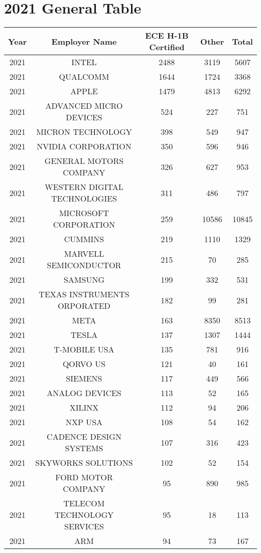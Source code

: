 \documentclass{article}%
\begin{document}
\section{2021 General Table}%
\label{sec:2021GeneralTable}%
\begin{longtable}{c|c|c|c|c}%
\hline%
Year&Employer Name&ECE \newline%
 H{-}1B \newline%
 Certified&Other&Total\\%
\hline%
2021&INTEL&2488&3119&5607\\%
\hline%
2021&QUALCOMM&1644&1724&3368\\%
\hline%
2021&APPLE&1479&4813&6292\\%
\hline%
2021&ADVANCED MICRO DEVICES&524&227&751\\%
\hline%
2021&MICRON TECHNOLOGY&398&549&947\\%
\hline%
2021&NVIDIA CORPORATION&350&596&946\\%
\hline%
2021&GENERAL MOTORS COMPANY&326&627&953\\%
\hline%
2021&WESTERN DIGITAL TECHNOLOGIES&311&486&797\\%
\hline%
2021&MICROSOFT CORPORATION&259&10586&10845\\%
\hline%
2021&CUMMINS&219&1110&1329\\%
\hline%
2021&MARVELL SEMICONDUCTOR&215&70&285\\%
\hline%
2021&SAMSUNG&199&332&531\\%
\hline%
2021&TEXAS INSTRUMENTS ORPORATED&182&99&281\\%
\hline%
2021&META&163&8350&8513\\%
\hline%
2021&TESLA&137&1307&1444\\%
\hline%
2021&T{-}MOBILE USA&135&781&916\\%
\hline%
2021&QORVO US&121&40&161\\%
\hline%
2021&SIEMENS&117&449&566\\%
\hline%
2021&ANALOG DEVICES&113&52&165\\%
\hline%
2021&XILINX&112&94&206\\%
\hline%
2021&NXP USA&108&54&162\\%
\hline%
2021&CADENCE DESIGN SYSTEMS&107&316&423\\%
\hline%
2021&SKYWORKS SOLUTIONS&102&52&154\\%
\hline%
2021&FORD MOTOR COMPANY&95&890&985\\%
\hline%
2021&TELECOM TECHNOLOGY SERVICES&95&18&113\\%
\hline%
2021&ARM&94&73&167\\%

\end{longtable}
\end{document}

